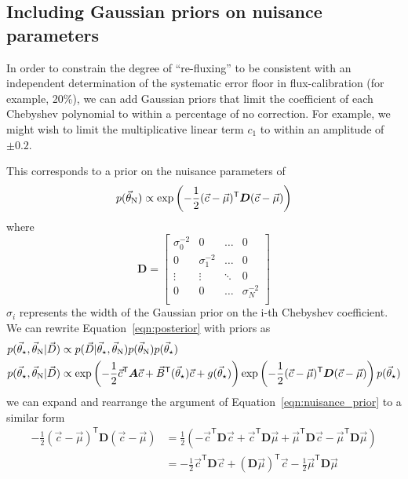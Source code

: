 \documentclass[preprint]{aastex} %
\newcommand{\vt}{\vec{\theta}}
\newcommand{\vstar}{\vt_{\star}}
\newcommand{\vN}{\vt_{\rm N}}
\newcommand{\vc}{\vec{c}}
\newcommand{\vD}{\vec{D}}
\newcommand{\trans}{\mathsf{T}}
\begin{document}
\subsection{Including Gaussian priors on nuisance parameters}
In order to constrain the degree of ``re-fluxing'' to be consistent with an independent determination of the systematic error floor in flux-calibration (for example, 20\%), we can add Gaussian priors that limit the coefficient of each Chebyshev polynomial to within a percentage of no correction. For example, we might wish to limit the multiplicative linear term $c_1$ to within an amplitude of $\pm 0.2$.

This corresponds to a prior on the nuisance parameters of
\begin{equation}
  p(\vN) \propto \exp \left ( -\frac{1}{2} (\vc - \vec{\mu})^\trans {\bm D} (\vc - \vec{\mu}) \right )
  \label{eqn:nuisance_prior} 
\end{equation}
where 
\begin{equation}
  {\bm D} = 
  \begin{bmatrix}
    \sigma_0^{-2} & 0 & \hdots & 0 \\
    0 & \sigma_1^{-2} & \hdots & 0 \\
    \vdots & \vdots & \ddots & 0 \\
    0 & 0 & \hdots & \sigma_N^{-2} \\
  \end{bmatrix}
\end{equation}
$\sigma_i$ represents the width of the Gaussian prior on the i-th Chebyshev coefficient. We can rewrite Equation~\ref{eqn:posterior} with priors as
\begin{align}
  p(\vstar, \vN | \vD) &\propto p( \vD | \vstar, \vN) p(\vN) p(\vstar)\\
  p(\vstar, \vN | \vD) &\propto \exp \left ( - \frac{1}{2} \vc^\trans {\bm A} \vc + \vec{B}^\trans(\vstar) \vc + g(\vstar) \right )  \exp \left ( -\frac{1}{2} (\vc - \vec{\mu})^\trans {\bm D} (\vc - \vec{\mu}) \right ) p(\vstar)
  \label{eqn:posterior_prior}
\end{align}
we can expand and rearrange the argument of Equation~\ref{eqn:nuisance_prior} to a similar form 
\begin{align}
  -\frac{1}{2} (\vc - \vec{\mu})^\trans {\bm D} (\vc - \vec{\mu}) &= \frac{1}{2}\left ( -\vc^\trans {\bm D} \vc + \vc^\trans {\bm D} \vec{\mu} + \vec{\mu}^\trans {\bm D} \vc - \vec{\mu}^\trans {\bm D} \vec{\mu} \right )\\
  &= -\frac{1}{2} \vc^\trans {\bm D} \vc + ({\bm D} \vec{\mu})^\trans \vc - \frac{1}{2} \vec{\mu}^\trans {\bm D} \vec{\mu}
\end{align}
\end{document}
